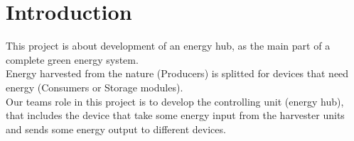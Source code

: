 
\section{Introduction}
	This project is about development of an energy hub, as the main part of a complete green energy system. 
	\\
	Energy harvested from the nature (Producers) is splitted  for devices that need energy (Consumers or Storage modules).
	\\
	Our teams role in this project is to develop the controlling unit (energy hub), that includes the device that take some energy input from the harvester units and sends some energy output to different devices.	
\newpage
